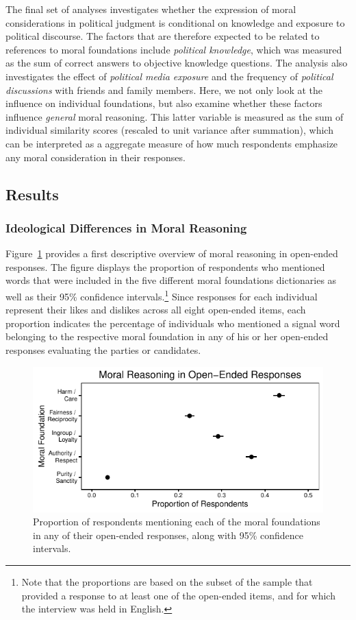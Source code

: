 \documentclass[12pt]{article}
\begin{document}
The final set of analyses investigates whether the expression of moral considerations in political judgment is conditional on knowledge and exposure to political discourse. The factors that are therefore expected to be related to references to moral foundations include \textit{political knowledge}, which was measured as the sum of correct answers to objective knowledge questions. The analysis also investigates the effect of \textit{political media exposure} and the frequency of \textit{political discussions} with friends and family members. Here, we not only look at the influence on individual foundations, but also examine whether these factors influence \textit{general} moral reasoning. This latter variable is measured as the sum of individual similarity scores (rescaled to unit variance after summation), which can be interpreted as a aggregate measure of how much respondents emphasize any moral consideration in their responses.



\subsection{Results}

\subsubsection{Ideological Differences in Moral Reasoning}

Figure~\ref{fig:prop_ideol} provides a first descriptive overview of moral reasoning in open-ended responses. The figure displays the proportion of respondents who mentioned words that were included in the five different moral foundations dictionaries as well as their 95\% confidence intervals.\footnote{Note that the proportions are based on the subset of the sample that provided a response to at least one of the open-ended items, and for which the interview was held in English.} Since responses for each individual represent their likes and dislikes across all eight open-ended items, each proportion indicates the percentage of individuals who mentioned a signal word belonging to the respective moral foundation in any of his or her open-ended responses evaluating the parties or candidates.

\begin{figure}[ht]\centering
\includegraphics{../calc/fig/prop_mft.pdf}
\caption{Proportion of respondents mentioning each of the moral foundations in any of their open-ended responses, along with 95\% confidence intervals.}\label{fig:prop_ideol}
\end{figure}
\end{document}
